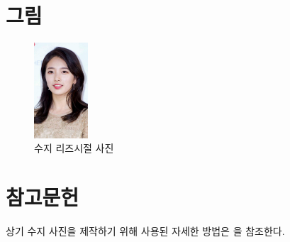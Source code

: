 \documentclass[12pt]{article}
\begin{document}
\section{그림}

\begin{figure}
	\centering
	\includegraphics[width=2cm]{fig/suji.jpg}
	\caption{수지 리즈시절 사진}
	\label{fig:label}
\end{figure}

\section{참고문헌}

상기 수지 사진을 제작하기 위해 사용된 자세한 방법은 \cite{Kopka2003}을 참조한다.

{}

\end{document}
